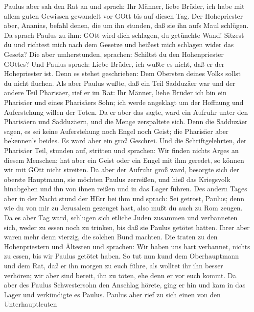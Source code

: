  Paulus aber sah den Rat an und sprach: Ihr Männer, liebe
Brüder, ich habe mit allem guten Gewissen gewandelt vor GOtt bis auf
diesen Tag.  Der Hohepriester aber, Ananias, befahl denen,
die um ihn stunden, daß sie ihn aufs Maul schlügen.  Da
sprach Paulus zu ihm: GOtt wird dich schlagen, du getünchte Wand!
Sitzest du und richtest mich nach dem Gesetze und heißest mich schlagen
wider das Gesetz?  Die aber umherstunden, sprachen: Schiltst
du den Hohenpriester GOttes?  Und Paulus sprach: Liebe
Brüder, ich wußte es nicht, daß er der Hohepriester ist. Denn es stehet
geschrieben: Dem Obersten deines Volks sollst du nicht fluchen.
 Als aber Paulus wußte, daß ein Teil Sadduzäer war und der
andere Teil Pharisäer, rief er im Rat: Ihr Männer, liebe Brüder ich bin
ein Pharisäer und eines Pharisäers Sohn; ich werde angeklagt um der
Hoffnung und Auferstehung willen der Toten.  Da er aber das
sagte, ward ein Aufruhr unter den Pharisäern und Sadduzäern, und die
Menge zerspaltete sich.  Denn die Sadduzäer sagen, es sei
keine Auferstehung noch Engel noch Geist; die Pharisäer aber bekennen's
beides.  Es ward aber ein groß Geschrei. Und die
Schriftgelehrten, der Pharisäer Teil, stunden auf, stritten und
sprachen: Wir finden nichts Arges an diesem Menschen; hat aber ein Geist
oder ein Engel mit ihm geredet, so können wir mit GOtt nicht streiten.
 Da aber der Aufruhr groß ward, besorgte sich der oberste
Hauptmann, sie möchten Paulus zerreißen, und hieß das Kriegsvolk
hinabgehen und ihn von ihnen reißen und in das Lager führen.
 Des andern Tages aber in der Nacht stund der HErr bei ihm
und sprach: Sei getrost, Paulus; denn wie du von mir zu Jerusalem
gezeuget hast, also mußt du auch zu Rom zeugen.  Da es aber
Tag ward, schlugen sich etliche Juden zusammen und verbanneten sich,
weder zu essen noch zu trinken, bis daß sie Paulus getötet hätten.
 Ihrer aber waren mehr denn vierzig, die solchen Bund
machten.  Die traten zu den Hohenpriestern und Ältesten und
sprachen: Wir haben uns hart verbannet, nichts zu essen, bis wir Paulus
getötet haben.  So tut nun kund dem Oberhauptmann und dem
Rat, daß er ihn morgen zu euch führe, als wolltet ihr ihn besser
verhören; wir aber sind bereit, ihn zu töten, ehe denn er vor euch
kommt.  Da aber des Paulus Schwestersohn den Anschlag
hörete, ging er hin und kam in das Lager und verkündigte es Paulus.
 Paulus aber rief zu sich einen von den Unterhauptleuten
